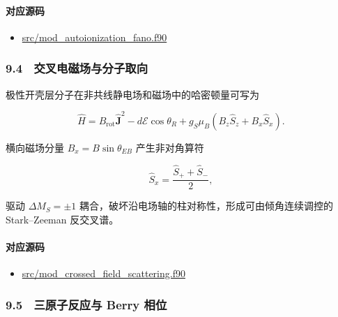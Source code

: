 \documentclass[
]{ctexbook}
\providecommand{\tightlist}{%
  \setlength{\itemsep}{0pt}\setlength{\parskip}{0pt}}
\begin{document}
\hypertarget{ux5bf9ux5e94ux6e90ux7801-41}{%
\paragraph{对应源码}\label{ux5bf9ux5e94ux6e90ux7801-41}}

\begin{itemize}
\tightlist
\item
  \href{https://github.com/l1Ha/QuantumGeneralModule/blob/main/src/mod_autoionization_fano.f90}{src/mod\_autoionization\_fano.f90}
\end{itemize}

\hypertarget{ux4ea4ux53c9ux7535ux78c1ux573aux4e0eux5206ux5b50ux53d6ux5411}{%
\subsubsection{9.4　交叉电磁场与分子取向}\label{ux4ea4ux53c9ux7535ux78c1ux573aux4e0eux5206ux5b50ux53d6ux5411}}

极性开壳层分子在非共线静电场和磁场中的哈密顿量可写为

\[
\hat H
=
B_{\mathrm{rot}}\hat{\mathbf J}^2
-
d\mathcal E\cos\theta_R
+
g_S\mu_B
\left(
B_z\hat S_z+B_x\hat S_x
\right).
\]

横向磁场分量 \(B_x=B\sin\theta_{EB}\) 产生非对角算符

\[
\hat S_x=\frac{\hat S_++\hat S_-}{2},
\]

驱动 \(\Delta M_S=\pm1\)
耦合，破坏沿电场轴的柱对称性，形成可由倾角连续调控的 Stark--Zeeman
反交叉谱。

\hypertarget{ux5bf9ux5e94ux6e90ux7801-42}{%
\paragraph{对应源码}\label{ux5bf9ux5e94ux6e90ux7801-42}}

\begin{itemize}
\tightlist
\item
  \href{https://github.com/l1Ha/QuantumGeneralModule/blob/main/src/mod_crossed_field_scattering.f90}{src/mod\_crossed\_field\_scattering.f90}
\end{itemize}

\hypertarget{ux4e09ux539fux5b50ux53cdux5e94ux4e0e-berry-ux76f8ux4f4d}{%
\subsubsection{9.5　三原子反应与 Berry
相位}\label{ux4e09ux539fux5b50ux53cdux5e94ux4e0e-berry-ux76f8ux4f4d}}
\end{document}
